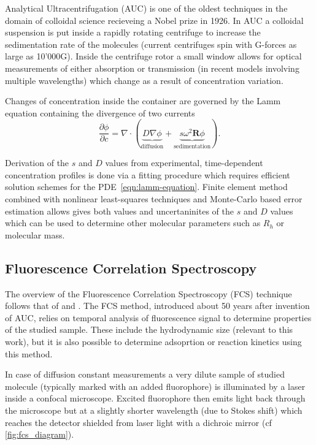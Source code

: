 \documentclass{doctoral}
\newcommand{\pd}{\partial}
\begin{document}
Analytical Ultracentrifugation (AUC) is one of the oldest techniques in the domain of colloidal science recieveing a Nobel prize in 1926. In AUC a colloidal suspension is put inside a rapidly rotating centrifuge to increase the sedimentation rate of the molecules (current centrifuges spin with G-forces as large as 10'000G). Inside the centrifuge rotor a small window allows for optical measurements of either absorption or transmission (in recent models involving multiple wavelengths) which change as a result of concentration variation.

Changes of concentration inside the container are governed by the Lamm equation containing the divergence of two currents
\begin{equation}
    \frac{\pd \phi}{\pd c} = 
    \nabla \cdot 
    \left( 
    \underbrace{D \nabla \phi}_\text{diffusion} + \underbrace{s \omega^2 \mathbf{R} \phi}_\text{sedimentation}
    \right).
    \label{eqn:lamm-equation}
\end{equation}

Derivation of the $s$ and $D$ values from experimental, time-dependent concentration profiles is done via a fitting procedure which requires efficient solution schemes for the PDE~\eqref{eqn:lamm-equation}\cite{Demeler_2016,Cao_2005}. Finite element method combined with nonlinear least-squares techniques and Monte-Carlo based error estimation allows gives both values and uncertaninites of the $s$ and $D$ values which can be used to determine other molecular parameters such as $R_h$ or molecular mass.

\subsection{Fluorescence Correlation Spectroscopy}

The overview of the Fluorescence Correlation Spectroscopy (FCS) technique follows that of \textcite{Tompson_2002} and \textcite{Gregor_2008}. The FCS method, introduced about 50 years after invention of AUC, relies on temporal analysis of fluorescence signal to determine properties of the studied sample. These include the hydrodynamic size (relevant to this work), but it is also possible to determine adsoprtion or reaction kinetics using this method.

In case of diffusion constant measurements a very dilute sample of studied molecule (typically marked with an added fluorophore) is illuminated by a laser inside a confocal microscope. Excited fluorophore then emits light back through the microscope but at a slightly shorter wavelength (due to Stokes shift) which reaches the detector shielded from laser light with a dichroic mirror (cf \ref{fig:fcs_diagram}).
\end{document}
